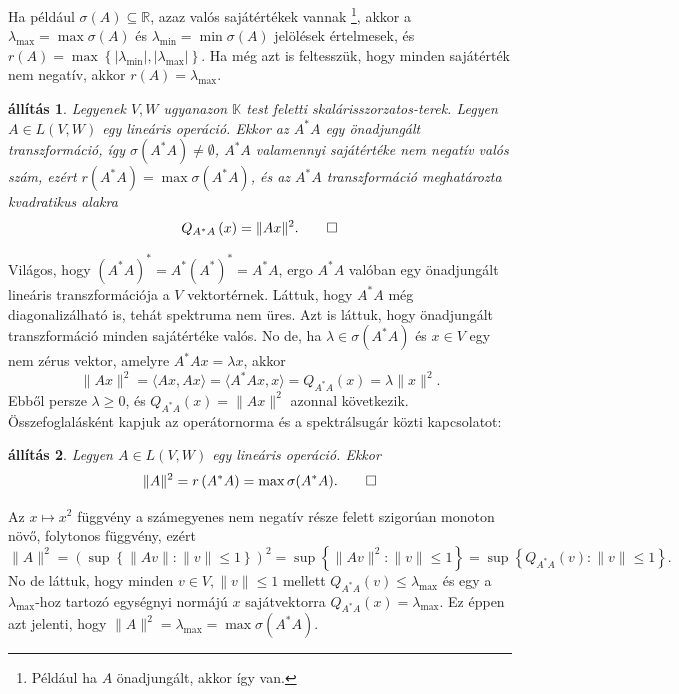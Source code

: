 \documentclass[a4paper, showtrims]{memoir}
\makeatletter
\renewenvironment{proof}[1][\proofname]
    {\par\pushQED{\qed}%
    \normalfont \topsep6\p@\@plus6\p@\relax
    \trivlist
    \item[\hskip\labelsep
        \itshape
    #1\@addpunct{:}]\ignorespaces}
    {\popQED\endtrivlist\@endpefalse}
\theoremstyle{plain}
\newtheorem{proposition}{állítás}[chapter]
\theoremstyle{remark}
\theoremstyle{definition}
\newcommand{\ip}[2]{\langle#1,#2\rangle}
\makeatother
\begin{document}
Ha például $\sigma\left( A \right)\subseteq\mathbb{R}$, azaz valós sajátértékek vannak
\footnote{Például ha $A$ önadjungált, akkor így van.}, akkor a
$\lambda_{\max}=\max\sigma\left( A \right)$ és
$\lambda_{\min}=\min\sigma\left( A \right)$ jelölések értelmesek,
és $r\left( A \right)=\max\left\{ |\lambda_{\min}|,|\lambda_{\max}| \right\}$.
Ha még azt is feltesszük, hogy minden sajátérték nem negatív,
akkor
$r\left( A \right)=\lambda_{\max}.$

\begin{proposition}
	Legyenek $V,W$ ugyanazon $\mathbb{K}$ test feletti skalárisszorzatos-terek.
	Legyen $A\in L\left( V,W \right)$ egy lineáris operáció.
	Ekkor az $A^\ast A$ egy önadjungált transzformáció,
	így $\sigma\left( A^\ast A \right)\neq \emptyset$,
	$A^\ast A$ valamennyi sajátértéke nem negatív valós szám,
	ezért
	$r\left( A^\ast A \right)=\max\sigma\left( A^\ast A \right)$, 
    és az $A^\ast A$ transzformáció meghatározta kvadratikus alakra 
    \[
        Q_{A^\ast A}\left( x \right)=\|Ax\|^2.
        \qedhere
    \]
\end{proposition}
\begin{proof}
	Világos, hogy $(A^\ast A)^\ast=A^\ast (A^\ast)^\ast=A^\ast A$,
	ergo $A^\ast A$ valóban egy önadjungált lineáris transzformációja a $V$ vektortérnek.
	Láttuk, hogy $A^\ast A$ még diagonalizálható is, tehát spektruma nem üres.
	Azt is láttuk, hogy önadjungált transzformáció minden sajátértéke valós.
	No de, ha $\lambda\in\sigma\left( A^\ast A \right)$ és $x\in V$ egy nem zérus vektor,
	amelyre $A^\ast Ax=\lambda x$, akkor
	\[
		\|Ax\|^2
        =
		\ip{Ax}{Ax}
        =
		\ip{A^\ast Ax}{x}
        =Q_{A^\ast A}\left( x \right)
        =
		\lambda\|x\|^2.
	\]
    Ebből persze $\lambda\geq 0$, és $Q_{A^\ast A}\left( x \right)=\|Ax\|^2$ azonnal következik.
\end{proof}
Összefoglalásként kapjuk az operátornorma és a spektrálsugár közti kapcsolatot:
\begin{proposition}
	Legyen $A\in L\left( V,W \right)$ egy lineáris operáció.
	Ekkor
	\[
		\|A\|^2=r\left( A^\ast A \right)=\max\sigma(A^\ast A).
		\qedhere
	\]
\end{proposition}
\begin{proof}
	Az $x \mapsto x^2$ függvény a számegyenes nem negatív része felett szigorúan monoton növő,
    folytonos függvény, 
	ezért
	\[
		\|A\|^2
		=
		\left(
		\sup\left\{ \|Av\|:\|v\|\leq 1 \right\}
		\right)^2
		=
		\sup\left\{ \|Av\|^2:\|v\|\leq 1 \right\}
		=
        \sup\left\{ Q_{A^\ast A}(v):\|v\|\leq 1 \right\}.
	\]
    No de láttuk, hogy minden $v\in V, \|v\|\leq 1$ mellett $Q_{A^\ast A}\left( v \right)\leq \lambda_{\max}$
    és egy a $\lambda_{\max}$-hoz tartozó egységnyi normájú $x$ sajátvektorra 
    $Q_{A^\ast A}\left( x \right)=\lambda_{\max}$.
    Ez éppen azt jelenti, hogy $\|A\|^2=\lambda_{\max}=\max\sigma(A^\ast A)$.
\end{proof}
\end{document}
